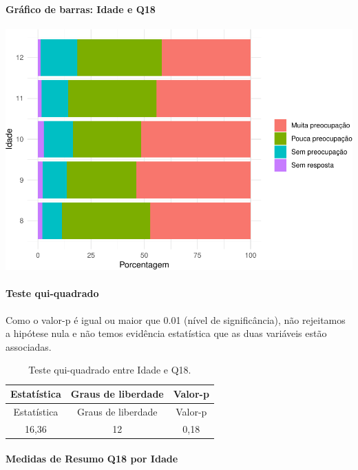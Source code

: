 \documentclass[]{article}
\let\oldparagraph\paragraph
\renewcommand{\paragraph}[1]{\oldparagraph{#1}\mbox{}}
\begin{document}
\hypertarget{gruxe1fico-de-barras-idade-e-q18}{%
\paragraph{Gráfico de barras: Idade e Q18}\label{gruxe1fico-de-barras-idade-e-q18}}

\begin{center}\includegraphics[width=0.75\linewidth]{relatorio_covid19_files/figure-latex/unnamed-chunk-270-1} \end{center}

\hypertarget{teste-qui-quadrado-24}{%
\paragraph{Teste qui-quadrado}\label{teste-qui-quadrado-24}}

Como o valor-p é igual ou maior que 0.01 (nível de significância), não rejeitamos a hipótese nula e não temos evidência estatística que as duas variáveis estão associadas.

\begin{longtable}[]{@{}ccc@{}}
\caption{\label{tab:unnamed-chunk-272}Teste qui-quadrado entre Idade e Q18.}\tabularnewline
\toprule
Estatística & Graus de liberdade & Valor-p\tabularnewline
\midrule
\endfirsthead
\toprule
Estatística & Graus de liberdade & Valor-p\tabularnewline
\midrule
\endhead
16,36 & 12 & 0,18\tabularnewline
\bottomrule
\end{longtable}

\cleardoublepage

\hypertarget{medidas-de-resumo-q18-por-idade}{%
\paragraph{Medidas de Resumo Q18 por Idade}\label{medidas-de-resumo-q18-por-idade}}
\end{document}
